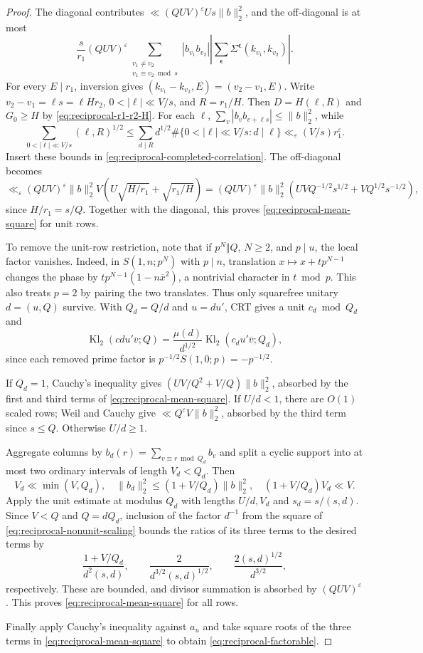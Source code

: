 \documentclass[12pt, a4paper]{amsart}
\numberwithin{equation}{section}
\newcommand{\ep}{\varepsilon}
\renewcommand{\bar}[1]{\overline{#1}}
\renewcommand{\le}{\leqslant}
\renewcommand{\ge}{\geqslant}
\theoremstyle{plain}
\begin{document}
\begin{proof}
The diagonal contributes $\ll(QUV)^\ep Us\|b\|_2^2$, and the off-diagonal is at most
$$
 \frac{s}{r_1}(QUV)^\ep
 \sum_{\substack{v_1\ne v_2\\v_1\equiv v_2\bmod s}}
 |b_{v_1}b_{v_2}|
 \left|\sum_{\boldsymbol\epsilon}
 \Sigma^{\boldsymbol\epsilon}(k_{v_1},k_{v_2})\right|.
$$
For every $E\mid r_1$, inversion gives $(k_{v_1}-k_{v_2},E)=(v_2-v_1,E)$. Write $v_2-v_1=\ell s=\ell Hr_2$, $0<|\ell|\ll V/s$, and $R=r_1/H$. Then $D=H(\ell,R)$ and $G_0\ge H$ by \eqref{eq:reciprocal-r1-r2-H}. For each $\ell$, $\sum_v|b_vb_{v+\ell s}|\le\|b\|_2^2$, while
$$
 \sum_{0<|\ell|\ll V/s}(\ell,R)^{1/2}
 \le\sum_{d\mid R}d^{1/2}\#\{0<|\ell|\ll V/s:d\mid\ell\}
 \ll_\ep (V/s)r_1^\ep.
$$
Insert these bounds in \eqref{eq:reciprocal-completed-correlation}. The off-diagonal becomes
$$
 \ll_\ep (QUV)^\ep\|b\|_2^2 V
 \left(U\sqrt{H/r_1}+\sqrt{r_1/H}\right)
 =(QUV)^\ep\|b\|_2^2
 \left(UVQ^{-1/2}s^{1/2}
       +VQ^{1/2}s^{-1/2}\right),
$$
since $H/r_1=s/Q$. Together with the diagonal, this proves \eqref{eq:reciprocal-mean-square} for unit rows.

To remove the unit-row restriction, note that if $p^N\Vert Q$, $N\ge2$, and $p\mid u$, the local factor vanishes. Indeed, in $S(1,n;p^N)$ with $p\mid n$, translation $x\mapsto x+tp^{N-1}$ changes the phase by $tp^{N-1}(1-n\bar x^2)$, a nontrivial character in $t\bmod p$. This also treats $p=2$ by pairing the two translates. Thus only squarefree unitary $d=(u,Q)$ survive. With $Q_d=Q/d$ and $u=du'$, CRT gives a unit $c_d\bmod Q_d$ and
\begin{equation}\label{eq:reciprocal-nonunit-scaling}
 \operatorname{Kl}_2(cdu'\bar v;Q)
 =\frac{\mu(d)}{d^{1/2}}
  \operatorname{Kl}_2(c_du'\bar v;Q_d),
\end{equation}
since each removed prime factor is $p^{-1/2}S(1,0;p)=-p^{-1/2}$.

If $Q_d=1$, Cauchy's inequality gives $(UV/Q^2+V/Q)\|b\|_2^2$, absorbed by the first and third terms of \eqref{eq:reciprocal-mean-square}. If $U/d<1$, there are $O(1)$ scaled rows; Weil and Cauchy give $\ll Q^\ep V\|b\|_2^2$, absorbed by the third term since $s\le Q$. Otherwise $U/d\ge1$.

Aggregate columns by $b_d(r)=\sum_{v\equiv r\bmod Q_d}b_v$ and split a cyclic support into at most two ordinary intervals of length $V_d<Q_d$. Then
$$
 V_d\ll\min(V,Q_d),\quad
 \|b_d\|_2^2\le(1+V/Q_d)\|b\|_2^2,\quad
 (1+V/Q_d)V_d\ll V.
$$
Apply the unit estimate at modulus $Q_d$ with lengths $U/d,V_d$ and $s_d=s/(s,d)$. Since $V<Q$ and $Q=dQ_d$, inclusion of the factor $d^{-1}$ from the square of \eqref{eq:reciprocal-nonunit-scaling} bounds the ratios of its three terms to the desired terms by
$$
 \frac{1+V/Q_d}{d^2(s,d)},\qquad
 \frac{2}{d^{3/2}(s,d)^{1/2}},\qquad
 \frac{2(s,d)^{1/2}}{d^{3/2}},
$$
respectively. These are bounded, and divisor summation is absorbed by $(QUV)^\ep$. This proves \eqref{eq:reciprocal-mean-square} for all rows.

Finally apply Cauchy's inequality against $a_u$ and take square roots of the three terms in \eqref{eq:reciprocal-mean-square} to obtain \eqref{eq:reciprocal-factorable}.
\end{proof}
\endgroup
\end{document}
